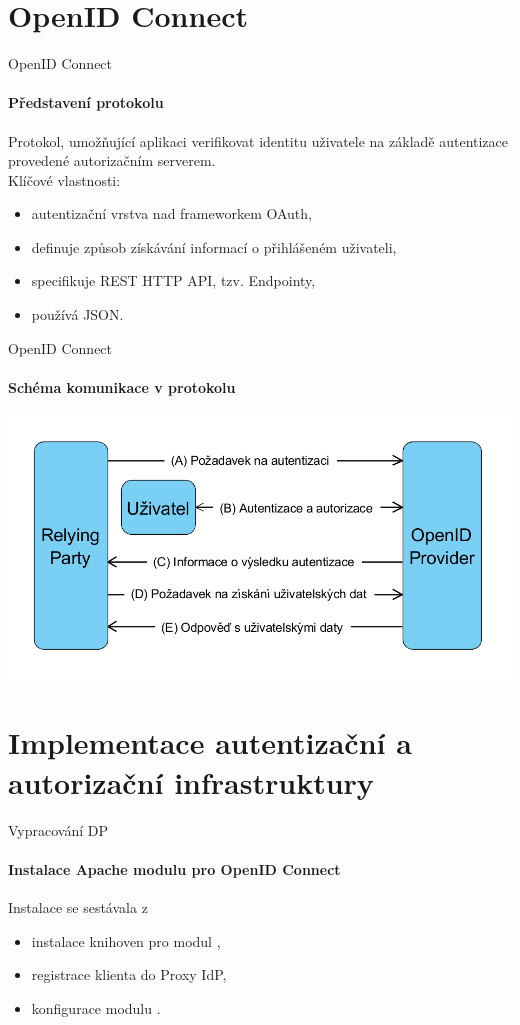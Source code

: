 \documentclass[
]{beamer}
\begin{document}
\section[OpenID Connect]{OpenID Connect}

\begin{frame}{OpenID Connect}
\framesubtitle{Představení protokolu}
Protokol, umožňující aplikaci verifikovat identitu uživatele na základě autentizace provedené autorizačním serverem.
\\
\medskip
Klíčové vlastnosti:
\begin{itemize}
  \item autentizační vrstva nad frameworkem OAuth,
  \item definuje způsob získávání informací o přihlášeném uživateli,
  \item specifikuje REST HTTP API, tzv. Endpointy,
  \item používá JSON.
\end{itemize}
\end{frame}

\begin{frame}{OpenID Connect}
\framesubtitle{Schéma komunikace v protokolu}
\includegraphics[width=\textwidth]{pics/diplomkaOIDC}
\end{frame}


\section[Implementace autentizační a autorizační infrastruktury]{Implementace autentizační a autorizační infrastruktury}

\begin{frame}{Vypracování DP}
\framesubtitle{Instalace Apache modulu pro OpenID Connect}
Instalace se sestávala z
\begin{itemize}
    \item instalace knihoven pro modul ,
    \item registrace klienta do Proxy IdP,
    \item konfigurace modulu .
\end{itemize}
\end{frame}
\end{document}
